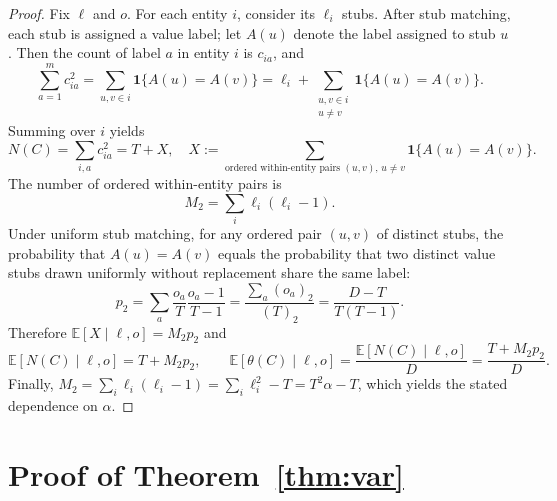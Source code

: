 \documentclass[11pt]{article}
\newcommand{\E}{\mathbb{E}}
\newcommand{\1}{\mathbf{1}}
\newcommand{\fall}[2]{\left(#1\right)_{#2}} %
\theoremstyle{plain}
\theoremstyle{definition}
\begin{document}
\begin{proof}
Fix $\ell$ and $o$.
For each entity $i$, consider its $\ell_i$ stubs.
After stub matching, each stub is assigned a value label; let $A(u)$ denote the label assigned to stub $u$.
Then the count of label $a$ in entity $i$ is $c_{ia}$, and
\[
\sum_{a=1}^m c_{ia}^2
=
\sum_{u,v \in i} \1\{A(u)=A(v)\}
=
\ell_i + \sum_{\substack{u,v\in i\\u\ne v}} \1\{A(u)=A(v)\}.
\]
Summing over $i$ yields
\[
N(C)=\sum_{i,a} c_{ia}^2 = T + X,
\quad
X := \sum_{\text{ordered within-entity pairs }(u,v),\,u\ne v}\1\{A(u)=A(v)\}.
\]
The number of ordered within-entity pairs is
\[
M_2=\sum_i \ell_i(\ell_i-1).
\]
Under uniform stub matching, for any ordered pair $(u,v)$ of distinct stubs, the probability that $A(u)=A(v)$ equals the probability that two distinct value stubs drawn uniformly without replacement share the same label:
\[
p_2 = \sum_a \frac{o_a}{T}\frac{o_a-1}{T-1}
= \frac{\sum_a \fall{o_a}{2}}{\fall{T}{2}}
= \frac{D-T}{T(T-1)}.
\]
Therefore $\E[X\mid \ell,o]=M_2 p_2$ and
\[
\E[N(C)\mid \ell,o] = T + M_2 p_2,
\qquad
\E[\theta(C)\mid \ell,o] = \frac{\E[N(C)\mid \ell,o]}{D} = \frac{T+M_2p_2}{D}.
\]
Finally, $M_2=\sum_i \ell_i(\ell_i-1)=\sum_i\ell_i^2 - T = T^2\alpha - T$, which yields the stated dependence on $\alpha$.
\end{proof}

\section{Proof of Theorem~\ref{thm:var}}
\label{app:varproof}
\end{document}
